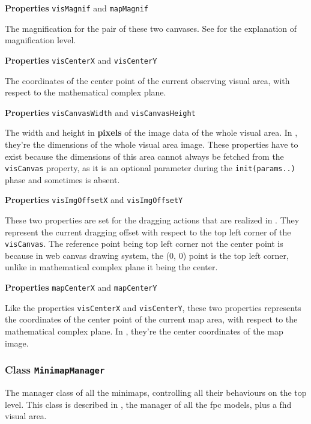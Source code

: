 \textbf{Properties} \texttt{visMagnif} and \texttt{mapMagnif}

The magnification for the pair of these two canvases. See  for the explanation of magnification level.

\textbf{Properties} \texttt{visCenterX} and \texttt{visCenterY}

The coordinates of the center point of the current observing visual area, with respect to the mathematical complex plane.

\textbf{Properties} \texttt{visCanvasWidth} and \texttt{visCanvasHeight}

The width and height in \textbf{pixels} of the image data of the whole visual area. In , they're the dimensions of the whole visual area image. These properties have to exist because the dimensions of this area cannot always be fetched from the \texttt{visCanvas} property, as it is an optional parameter during the \texttt{init(params..)} phase and sometimes is absent.

\textbf{Properties} \texttt{visImgOffsetX} and \texttt{visImgOffsetY}

These two properties are set for the dragging actions that are realized in . They represent the current dragging offset with respect to the top left corner of the \texttt{visCanvas}. The reference point being top left corner not the center point is because in web canvas drawing system, the (0, 0) point is the top left corner, unlike in mathematical complex plane it being the center.

\textbf{Properties} \texttt{mapCenterX} and \texttt{mapCenterY}

Like the properties \texttt{visCenterX} and \texttt{visCenterY}, these two properties represents the coordinates of the center point of the current \gls{map} area, with respect to the mathematical complex plane. In , they're the center coordinates of the \gls{map} image.

\subsubsection{Class \texttt{MinimapManager}}\label{chap4:minimapmanager}

The manager class of all the minimaps, controlling all their behaviours on the top level. This class is described in , the manager of all the \gls{fpc} models, plus a \gls{fhd} visual area.

